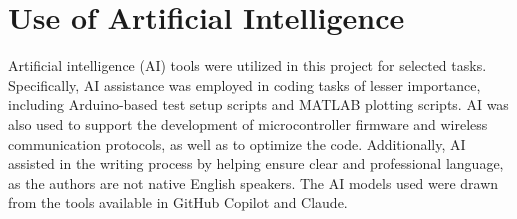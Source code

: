 \section*{Use of Artificial Intelligence}

Artificial intelligence (AI) tools were utilized in this project for selected tasks. Specifically, AI assistance was employed in coding tasks of lesser importance, including Arduino-based test setup scripts and MATLAB plotting scripts. AI was also used to support the development of microcontroller firmware and wireless communication protocols, as well as to optimize the code.
Additionally, AI assisted in the writing process by helping ensure clear and professional language, as the authors are not native English speakers.
The AI models used were drawn from the tools available in GitHub Copilot and Claude.